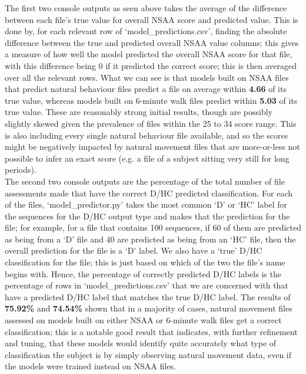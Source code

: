 \documentclass[12pt,twoside]{report}
\begin{document}
\quad The first two console outputs as seen above takes the average of the difference between each file’s true value for overall NSAA score and predicted value. This is done by, for each relevant row of ‘model\_predictions.csv’, finding the absolute difference between the true and predicted overall NSAA value columns; this gives a measure of how well the model predicted the overall NSAA score for that file, with this difference being 0 if it predicted the correct score; this is then averaged over all the relevant rows. What we can see is that models built on NSAA files that predict natural behaviour files predict a file on average within \textbf{4.66} of its true value, whereas models built on 6-minute walk files predict within \textbf{5.03} of its true value. These are reasonably strong initial results, though are possibly slightly skewed given the prevalence of files within the 25 to 34 score range. This is also including every single natural behaviour file available, and so the scores might be negatively impacted by natural movement files that are more-or-less not possible to infer an exact score (e.g. a file of a subject sitting very still for long periods).\\

\quad The second two console outputs are the percentage of the total number of file assessments made that have the correct D/HC predicted classification. For each of the files, ‘model\_predictor.py’ takes the most common ‘D’ or ‘HC’ label for the sequences for the D/HC output type and makes that the prediction for the file; for example, for a file that contains 100 sequences, if 60 of them are predicted as being from a ‘D’ file and 40 are predicted as being from an ‘HC’ file, then the overall prediction for the file is a ‘D’ label. We also have a ‘true’ D/HC classification for the file; this is just based on which of the two the file’s name begins with. Hence, the percentage of correctly predicted D/HC labels is the percentage of rows in ‘model\_predictions.csv’ that we are concerned with that have a predicted D/HC label that matches the true D/HC label. The results of \textbf{75.92\%} and \textbf{74.54\%} shown that in a majority of cases, natural movement files assessed on models built on either NSAA or 6-minute walk files get a correct classification; this is a notable good result that indicates, with further refinement and tuning, that these models would identify quite accurately what type of classification the subject is by simply observing natural movement data, even if the models were trained instead on NSAA files.\\
\end{document}
